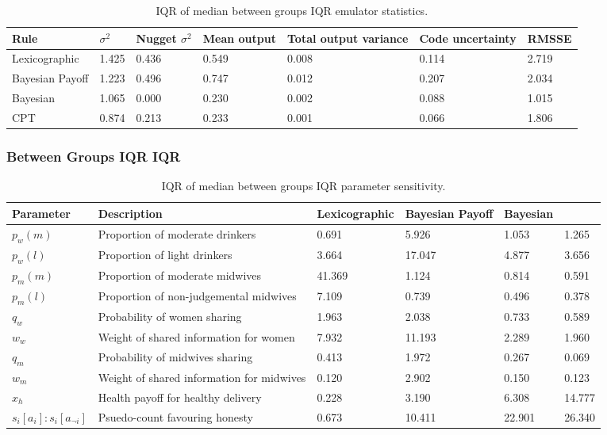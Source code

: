 \begin{table}[h!]
\center
\begin{tabular} {|l | l | l | l | l | l |}
\hline
Rule & \(\sigma^2\) & Nugget \(\sigma^2\) & Mean output & Total output variance & Code uncertainty & RMSSE \\ \hline
Lexicographic & 1.425 & 0.436 & 0.549 & 0.008 & 0.114 & 2.719 \\ \hline
Bayesian Payoff & 1.223 & 0.496 & 0.747 & 0.012 & 0.207 & 2.034 \\ \hline
Bayesian &  1.065 & 0.000 & 0.230 & 0.002 & 0.088 & 1.015 \\ \hline
\ac{CPT} & 0.874 & 0.213 & 0.233 & 0.001 & 0.066 & 1.806 \\ \hline
\end{tabular}
\caption[Table caption text]{IQR of median between groups IQR emulator statistics. \label{tab:sa_emulator_sig_iqr}}
\end{table}

\subsubsection{Between Groups IQR IQR}

\begin{table}[h!]
\center
\begin{tabular} {|l | l | l | l | l | l |}
\hline
Parameter & Description & Lexicographic & Bayesian Payoff & Bayesian & \ac(CPT) \\ \hline
\(p_{w}(m)\) & Proportion of moderate drinkers & 0.691 & 5.926 & 1.053 & 1.265 \\ \hline
\(p_{w}(l)\) & Proportion of light drinkers & 3.664 & 17.047 & 4.877 & 3.656 \\ \hline
\(p_{m}(m)\) & Proportion of moderate midwives & 41.369 & 1.124 & 0.814 & 0.591 \\ \hline
\(p_{m}(l)\) & Proportion of non-judgemental midwives & 7.109 & 0.739 & 0.496 & 0.378 \\ \hline
\(q_{w}\) & Probability of women sharing & 1.963 & 2.038 & 0.733 & 0.589 \\ \hline
\(w_{w}\) & Weight of shared information for women & 7.932 & 11.193 & 2.289 & 1.960 \\ \hline
\(q_{m}\) & Probability of midwives sharing & 0.413 & 1.972 & 0.267 & 0.069\\ \hline
\(w_{m}\) & Weight of shared information for midwives & 0.120 & 2.902 & 0.150 & 0.123 \\ \hline
\(x_{h}\) & Health payoff for healthy delivery & 0.228 & 3.190 & 6.308 & 14.777 \\ \hline
\(s_{i}[a_{i}]:s_{i}[a_{\neg i}]\) & Psuedo-count favouring honesty & 0.673 & 10.411 & 22.901 & 26.340 \\ \hline
\end{tabular}
\caption[Table caption text]{IQR of median between groups IQR parameter sensitivity. \label{tab:sa_results_iqr_iqr}}
\end{table}

